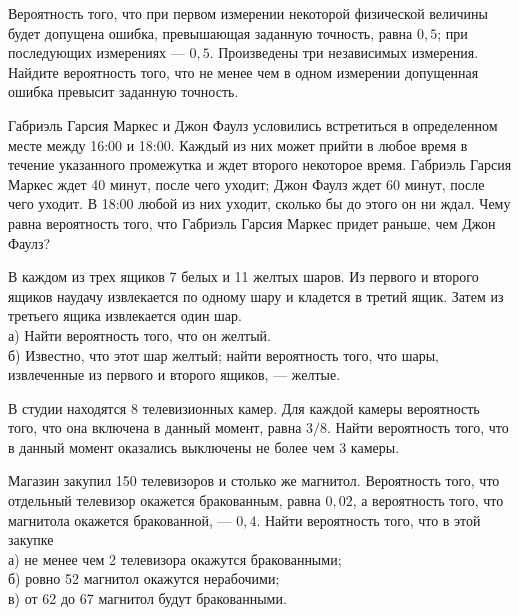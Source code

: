 \newpage\setcounter{zad}{0}



\begin{zkrW}{20}\noindent 
	Вероятность того, что при первом измерении некоторой физической величины будет допущена ошибка, превышающая заданную точность, равна $0{,}5$; при последующих измерениях --- $0{,}5$. Произведены три независимых измерения. Найдите вероятность того, что не менее чем в одном измерении допущенная ошибка превысит заданную точность.
 
\end{zkrW}

\begin{zkrW}{20}\noindent 
	Габриэль Гарсия Маркес и Джон Фаулз условились встретиться в определенном месте между 16:00 и 18:00. Каждый из них может прийти в любое время в течение указанного промежутка и ждет второго некоторое время. Габриэль Гарсия Маркес ждет 40 минут, после чего уходит; Джон Фаулз ждет 60 минут, после чего уходит. В 18:00 любой из них уходит, сколько бы до этого он ни ждал. Чему равна вероятность того, что Габриэль Гарсия Маркес придет раньше, чем Джон Фаулз?
 
\end{zkrW}

\begin{zkrW}{20}\noindent 
	В каждом из трех ящиков 7 белых и 11 желтых шаров. Из первого и второго ящиков наудачу извлекается по одному шару и кладется в третий ящик. Затем из третьего ящика извлекается один шар. \\ \indent а) Найти вероятность того, что он желтый. \\ \indent б) Известно, что этот шар желтый; найти вероятность того, что шары, извлеченные из первого и второго ящиков, --- желтые.
 
\end{zkrW}

\begin{zkrW}{20}\noindent 
	В студии находятся 8 телевизионных камер. Для каждой камеры вероятность того, что она включена в данный момент, равна $3/8$. Найти вероятность того, что в данный момент оказались выключены не более чем 3 камеры.
 
\end{zkrW}

\begin{zkrW}{20}\noindent 
	Магазин закупил 150 телевизоров и столько же магнитол. Вероятность того, что отдельный телевизор окажется бракованным, равна $0{,}02$, а вероятность того, что магнитола окажется бракованной, --- $0{,}4$. Найти вероятность того, что в этой закупке \\ \indent а) не менее чем 2 телевизора окажутся бракованными; \\ \indent б) ровно 52 магнитол окажутся нерабочими; \\ \indent в) от 62 до 67 магнитол будут бракованными.
 
\end{zkrW}

